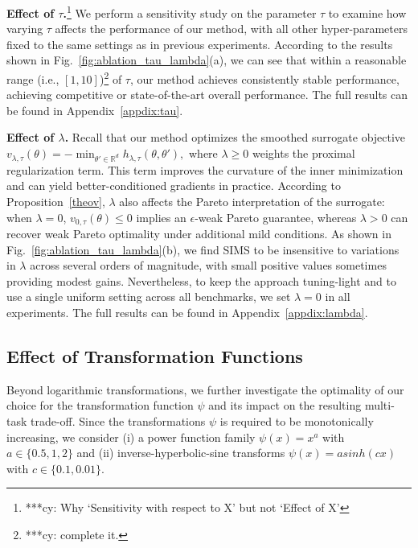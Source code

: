 \documentclass[sigconf]{acmart}
\begin{document}
\noindent \textbf{Effect of $\tau$.}\footnote{***cy: Why `Sensitivity with respect to X' but not `Effect of X' }
We perform a sensitivity study on the parameter $\tau$ to examine how varying $\tau$ affects the performance of our method, with all other hyper-parameters fixed to the same settings as in previous experiments. According to the results shown in Fig.~\ref{fig:ablation_tau_lambda}(a), we can see that within a reasonable range (i.e., $[1, 10]$)\footnote{***cy: complete it. } of $\tau$, our method achieves consistently stable performance, achieving competitive or state-of-the-art overall performance. The full results can be found in Appendix~\ref{appdix:tau}.
\vspace{0.8\baselineskip}

\noindent \textbf{Effect of $\lambda$. }
Recall that our method optimizes the smoothed surrogate objective
$v_{\lambda, \tau}(\theta)=-
    \min_{\theta' \in \mathbb{R}^d}
    h_{\lambda,\tau}(\theta,\theta'),$
where $\lambda \ge 0$ weights the proximal regularization term. This term improves the curvature of the inner minimization and can yield better-conditioned gradients in practice. According to Proposition~\ref{theov}, $\lambda$ also affects the Pareto interpretation of the surrogate: when $\lambda=0$, $v_{0, \tau}(\theta)\le 0$ implies an $\epsilon$-weak Pareto guarantee, whereas $\lambda > 0$ can recover weak Pareto optimality under additional mild conditions. As shown in Fig.~\ref{fig:ablation_tau_lambda}(b), we find SIMS to be insensitive to variations in $\lambda$ across several orders of magnitude, with small positive values sometimes providing modest gains. Nevertheless, to keep the approach tuning-light and to use a single uniform setting across all benchmarks, we set $\lambda =0$ in all experiments. The full results can be found in Appendix~\ref{appdix:lambda}.

\vspace{-5pt}

\subsection{Effect of Transformation Functions}
\label{subsec:trans}
Beyond logarithmic transformations, we further investigate the optimality of our choice for the transformation function $\psi$ and its impact on the resulting multi-task trade-off. Since the transformations $\psi$ is required to be monotonically increasing, we consider (i) a power function family $\psi(x)=x^a$ with $a\in\{0.5,1,2\}$ and (ii) inverse-hyperbolic-sine transforms $\psi(x)=asinh(cx)$ with $c\in\{0.1,0.01\}$.
\end{document}
